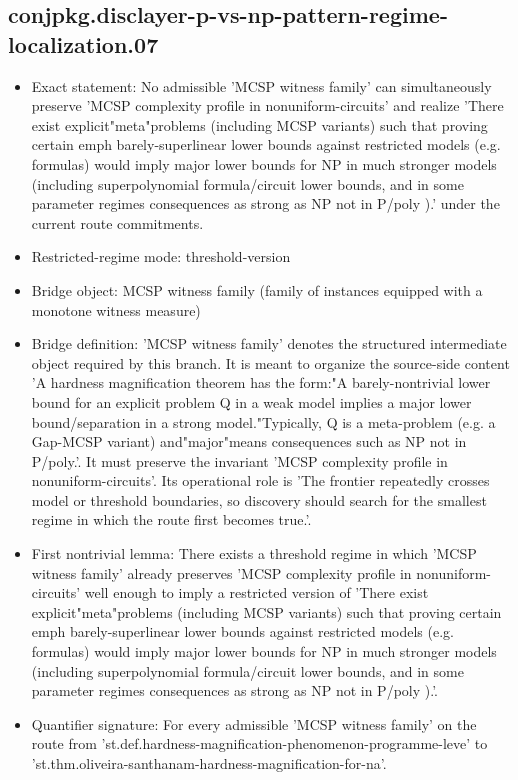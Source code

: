 \documentclass[11pt]{article}
\begin{document}
\subsection*{conjpkg.disclayer-p-vs-np-pattern-regime-localization.07}
\begin{itemize}
\item Exact statement: No admissible 'MCSP witness family' can simultaneously preserve 'MCSP complexity profile in nonuniform-circuits' and realize 'There exist explicit"meta"problems (including MCSP variants) such that proving certain emph barely-superlinear lower bounds against restricted models (e.g. formulas) would imply major lower bounds for NP in much stronger models (including superpolynomial formula/circuit lower bounds, and in some parameter regimes consequences as strong as NP not in P/poly ).' under the current route commitments.
\item Restricted-regime mode: threshold-version
\item Bridge object: MCSP witness family (family of instances equipped with a monotone witness measure)
\item Bridge definition: 'MCSP witness family' denotes the structured intermediate object required by this branch. It is meant to organize the source-side content 'A hardness magnification theorem has the form:"A barely-nontrivial lower bound for an explicit problem Q in a weak model implies a major lower bound/separation in a strong model."Typically, Q is a meta-problem (e.g. a Gap-MCSP variant) and"major"means consequences such as NP not in P/poly.'. It must preserve the invariant 'MCSP complexity profile in nonuniform-circuits'. Its operational role is 'The frontier repeatedly crosses model or threshold boundaries, so discovery should search for the smallest regime in which the route first becomes true.'.
\item First nontrivial lemma: There exists a threshold regime in which 'MCSP witness family' already preserves 'MCSP complexity profile in nonuniform-circuits' well enough to imply a restricted version of 'There exist explicit"meta"problems (including MCSP variants) such that proving certain emph barely-superlinear lower bounds against restricted models (e.g. formulas) would imply major lower bounds for NP in much stronger models (including superpolynomial formula/circuit lower bounds, and in some parameter regimes consequences as strong as NP not in P/poly ).'.
\item Quantifier signature: For every admissible 'MCSP witness family' on the route from 'st.def.hardness-magnification-phenomenon-programme-leve' to 'st.thm.oliveira-santhanam-hardness-magnification-for-na'.

\end{itemize}
\end{document}
